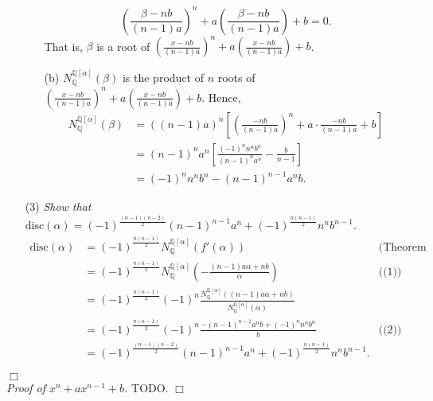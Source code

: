\documentclass{article}
\begin{document}
\begin{enumerate}
\begin{enumerate}
  $$\left( \frac{\beta-nb}{(n-1)a} \right)^n
    + a\left( \frac{\beta-nb}{(n-1)a} \right) + b = 0.$$
  That is, $\beta$ is a root of
  $\left( \frac{x-nb}{(n-1)a} \right)^n + a\left( \frac{x-nb}{(n-1)a} \right) + b$.
  \item[(b)]
  $N_{\mathbb{Q}}^{\mathbb{Q}[\alpha]}(\beta)$ is the product of $n$ roots of
  $\left( \frac{x-nb}{(n-1)a} \right)^n + a\left( \frac{x-nb}{(n-1)a} \right) + b$.
  Hence,
  \begin{align*}
  N_{\mathbb{Q}}^{\mathbb{Q}[\alpha]}(\beta)
  &= ((n-1)a)^n\left[ \left(\frac{-nb}{(n-1)a}\right)^n
    + a \cdot \frac{-nb}{(n-1)a} + b \right] \\
  &= (n-1)^n a^n\left[ \frac{(-1)^n n^n b^n}{(n-1)^n a^n} - \frac{b}{n-1} \right] \\
  &= (-1)^n n^n b^n - (n-1)^{n-1} a^n b.
  \end{align*}
  \end{enumerate}
\item[(3)]
\emph{Show that $\text{disc}(\alpha) = (-1)^{\frac{(n-1)(n-2)}{2}} (n-1)^{n-1}a^n
  + (-1)^{\frac{n(n-1)}{2}} n^n b^{n-1}$.}
\begin{align*}
\text{disc}(\alpha)
&= (-1)^{\frac{n(n-1)}{2}} N_{\mathbb{Q}}^{\mathbb{Q}[\alpha]}(f'(\alpha))
  &\text{(Theorem 2.8)} \\
&= (-1)^{\frac{n(n-1)}{2}} N_{\mathbb{Q}}^{\mathbb{Q}[\alpha]}
  \left( -\frac{(n-1)a\alpha+nb}{\alpha} \right)
  &\text{((1))} \\
&= (-1)^{\frac{n(n-1)}{2}}(-1)^n
  \frac{N_{\mathbb{Q}}^{\mathbb{Q}[\alpha]}((n-1)a\alpha+nb)}
  {N_{\mathbb{Q}}^{\mathbb{Q}[\alpha]}(\alpha)} \\
&= (-1)^{\frac{n(n-1)}{2}}(-1)^n \frac{-(n-1)^{n-1}a^nb+(-1)^n n^n b^n}{b}
  &\text{((2))} \\
&= (-1)^{\frac{(n-1)(n-2)}{2}} (n-1)^{n-1}a^n
  + (-1)^{\frac{n(n-1)}{2}} n^n b^{n-1}.
\end{align*}
\end{enumerate}
$\Box$ \\

\emph{Proof of $x^n + ax^{n-1} + b$.}
TODO.
$\Box$ \\\\



\end{document}
